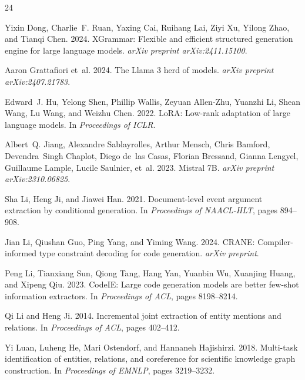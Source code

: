 \documentclass[11pt]{article}
\begin{document}
\begin{thebibliography}{24}

Yixin Dong, Charlie~F. Ruan, Yaxing Cai, Ruihang Lai, Ziyi Xu, Yilong Zhao, and Tianqi Chen. 2024.
\newblock XGrammar: Flexible and efficient structured generation engine for large language models.
\newblock \textit{arXiv preprint arXiv:2411.15100}.

Aaron Grattafiori et~al. 2024.
\newblock The Llama 3 herd of models.
\newblock \textit{arXiv preprint arXiv:2407.21783}.

Edward~J. Hu, Yelong Shen, Phillip Wallis, Zeyuan Allen-Zhu, Yuanzhi Li, Shean Wang, Lu Wang, and Weizhu Chen. 2022.
\newblock LoRA: Low-rank adaptation of large language models.
\newblock In \textit{Proceedings of ICLR}.

Albert~Q. Jiang, Alexandre Sablayrolles, Arthur Mensch, Chris Bamford, Devendra~Singh Chaplot, Diego de~las Casas, Florian Bressand, Gianna Lengyel, Guillaume Lample, Lucile Saulnier, et~al. 2023.
\newblock Mistral 7B.
\newblock \textit{arXiv preprint arXiv:2310.06825}.

Sha Li, Heng Ji, and Jiawei Han. 2021.
\newblock Document-level event argument extraction by conditional generation.
\newblock In \textit{Proceedings of NAACL-HLT}, pages 894--908.

Jian Li, Qiushan Guo, Ping Yang, and Yiming Wang. 2024.
\newblock CRANE: Compiler-informed type constraint decoding for code generation.
\newblock \textit{arXiv preprint}.

Peng Li, Tianxiang Sun, Qiong Tang, Hang Yan, Yuanbin Wu, Xuanjing Huang, and Xipeng Qiu. 2023.
\newblock CodeIE: Large code generation models are better few-shot information extractors.
\newblock In \textit{Proceedings of ACL}, pages 8198--8214.

Qi Li and Heng Ji. 2014.
\newblock Incremental joint extraction of entity mentions and relations.
\newblock In \textit{Proceedings of ACL}, pages 402--412.

Yi Luan, Luheng He, Mari Ostendorf, and Hannaneh Hajishirzi. 2018.
\newblock Multi-task identification of entities, relations, and coreference for scientific knowledge graph construction.
\newblock In \textit{Proceedings of EMNLP}, pages 3219--3232.


\end{thebibliography}
\end{document}
